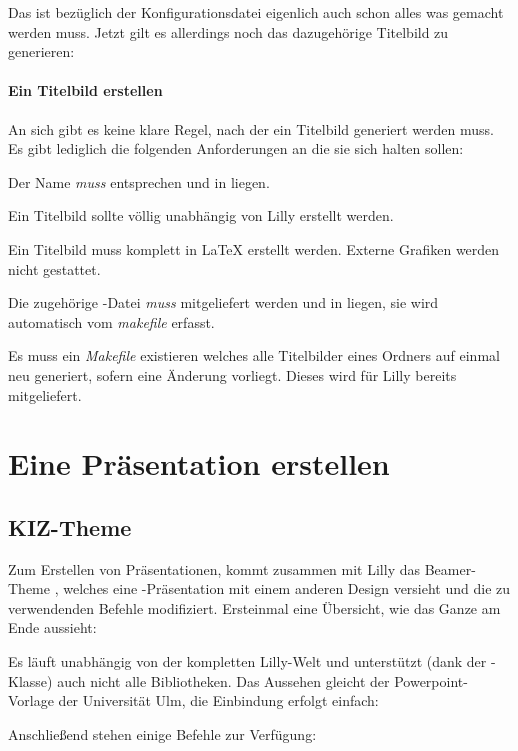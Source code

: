 Das ist bezüglich der Konfigurationsdatei eigenlich auch schon alles was gemacht werden muss. Jetzt gilt es allerdings noch das dazugehörige Titelbild zu generieren:

\paragraph{Ein Titelbild erstellen}
An sich gibt es keine klare Regel, nach der ein Titelbild generiert werden muss. Es gibt lediglich die folgenden Anforderungen an die sie sich halten sollen:
\begin{ditemize}
    \item Der Name \emph{muss}  entsprechen und in  liegen.
    \item Ein Titelbild sollte völlig unabhängig von Lilly erstellt werden.
    \item Ein Titelbild muss komplett in \LaTeX{} erstellt werden. Externe Grafiken werden nicht gestattet.
    \item Die zugehörige -Datei \emph{muss} mitgeliefert werden und in  liegen, sie wird automatisch vom \emph{makefile} erfasst.
    \item Es muss ein \emph{Makefile} existieren welches alle Titelbilder eines Ordners auf einmal neu generiert, sofern eine Änderung vorliegt. Dieses wird für Lilly bereits mitgeliefert.
\end{ditemize}

\section{Eine Präsentation erstellen}
\subsection{KIZ-Theme}
Zum Erstellen von Präsentationen, kommt zusammen mit Lilly das Beamer-Theme , welches eine -Präsentation mit einem anderen Design versieht und die zu verwendenden Befehle modifiziert. Ersteinmal eine Übersicht, wie das Ganze am Ende aussieht:
\begin{tcbraster}[raster columns=3, blankest,colback=white]
\end{tcbraster}
Es läuft unabhängig von der kompletten Lilly-Welt und unterstützt (dank der -Klasse) auch nicht alle Bibliotheken. Das Aussehen gleicht der Powerpoint-Vorlage der Universität Ulm, die Einbindung erfolgt einfach:
Anschließend stehen einige Befehle zur Verfügung:

